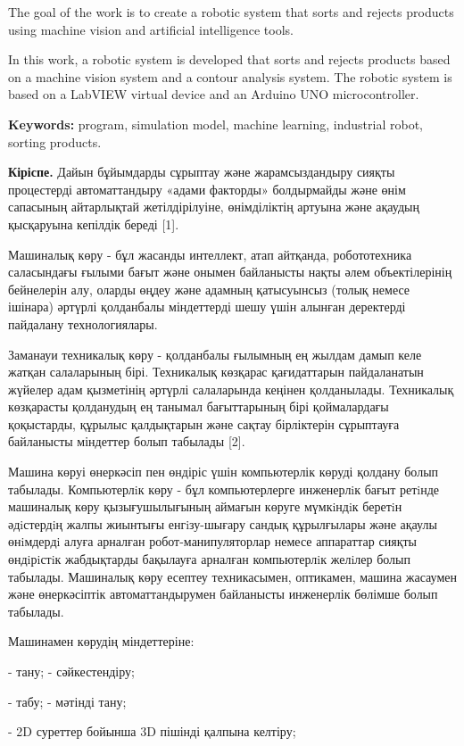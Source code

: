 The goal of the work is to create a robotic system that sorts and
rejects products using machine vision and artificial intelligence tools.

In this work, a robotic system is developed that sorts and rejects
products based on a machine vision system and a contour analysis system.
The robotic system is based on a LabVIEW virtual device and an Arduino
UNO microcontroller.

{\bfseries Keywords:} program, simulation model, machine learning,
industrial robot, sorting products.
\vspace{-0.5em}
\begin{multicols}{2}
{\bfseries Кіріспе.} Дайын бұйымдарды сұрыптау және жарамсыздандыру сияқты
процестерді автоматтандыру «адами факторды» болдырмайды және өнім
сапасының айтарлықтай жетілдірілуіне, өнімділіктің артуына және ақаудың
қысқаруына кепілдік береді {[}1{]}.

Машиналық көру - бұл жасанды интеллект, атап айтқанда, робототехника
саласындағы ғылыми бағыт және онымен байланысты нақты әлем
объектілерінің бейнелерін алу, оларды өңдеу және адамның қатысуынсыз
(толық немесе ішінара) әртүрлі қолданбалы міндеттерді шешу үшін алынған
деректерді пайдалану технологиялары.

Заманауи техникалық көру - қолданбалы ғылымның ең жылдам дамып келе
жатқан салаларының бірі. Техникалық көзқарас қағидаттарын пайдаланатын
жүйелер адам қызметінің әртүрлі салаларында кеңінен қолданылады.
Техникалық көзқарасты қолданудың ең танымал бағыттарының бірі
қоймалардағы қоқыстарды, құрылыс қалдықтарын және сақтау бірліктерін
сұрыптауға байланысты міндеттер болып табылады {[}2{]}.

Машина көруі өнеркәсіп пен өндіріс үшін компьютерлік көруді қолдану
болып табылады. Компьютерлiк көру - бұл компьютерлерге инженерлiк бағыт
ретiнде машиналық көру қызығушылығының аймағын көруге мүмкiндiк беретiн
әдiстердiң жалпы жиынтығы енгiзу-шығару сандық құрылғылары және ақаулы
өнiмдердi алуға арналған робот-манипуляторлар немесе аппараттар сияқты
өндiрiстiк жабдықтарды бақылауға арналған компьютерлiк желiлер болып
табылады. Машиналық көру есептеу техникасымен, оптикамен, машина
жасаумен және өнеркәсіптік автоматтандырумен байланысты инженерлік
бөлімше болып табылады.

Машинамен көрудің міндеттеріне:

- тану; - сәйкестендіру;

- табу; - мәтінді тану;

- 2D суреттер бойынша 3D пішінді қалпына келтіру;


\end{multicols}
